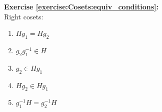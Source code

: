 \noindent\textbf{Exercise \ref{exercise:Cosets:equiv_conditions}:} %
\\
Right cosets:
\begin{multicols}{3}
\begin{enumerate}
\item
$Hg_1 = Hg_2$

\item
$g_2 g_1^{-1} \in H$

\item
$g_2 \in Hg_1$

\item
$Hg_2 \in Hg_1$

\item
$g_1^{-1}H = g_2^{-1}H$
\end{enumerate}
\end{multicols}

